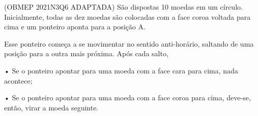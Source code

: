 \documentclass[preview]{standalone}
\begin{document}
\begin{flushleft}
(OBMEP 2021N3Q6 ADAPTADA) São dispostas 10 moedas em um círculo.
Inicialmente, todas as dez moedas são colocadas com a face coroa voltada para cima e um
ponteiro aponta para a posição A. 


 Esse ponteiro começa a se movimentar no sentido anti-horário,
saltando de uma posição para a outra mais próxima. 
Após cada salto,

      • Se o ponteiro apontar para uma moeda
com a face cara para cima, nada acontece;

      • Se o ponteiro apontar para uma moeda
com a face coroa para cima, deve-se, então,
virar a moeda seguinte.
\end{flushleft}
\end{document}
